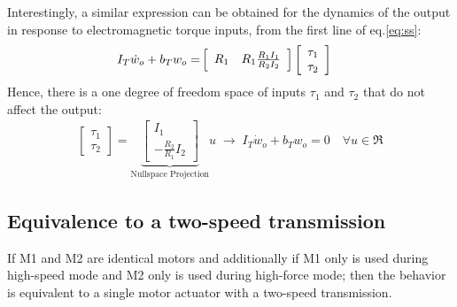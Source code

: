 Interestingly, a similar expression can be obtained for the dynamics of the output in response to electromagnetic torque inputs, from the first line of eq.\eqref{eq:ss}:
%
\begin{align}
I_T \dot{w}_o +
b_T  w_o
=&
\left[ \begin{array}{c c}
R_1 & R_1 \frac{R_1 I_1}{R_2 I_2}
\end{array} \right]
\left[ \begin{array}{c}
\tau_1 \\
\tau_2
\end{array} \right]
\label{eq:output}
\end{align}
% 
Hence, there is a one degree of freedom space of inputs $\tau_1$ and $\tau_2$ that do not affect the output:
\begin{align}
\left[ \begin{array}{c}
\tau_1 \\
\tau_2
\end{array} \right]
 = 
\underbrace{\left[ \begin{array}{c}
I_1 \\
-\frac{R_2 }{R_1 }  I_2
\end{array} \right]}_{\text{Nullspace Projection}} u
\; \rightarrow \;
I_T \dot{w}_o +
b_T  w_o = 0 \quad \forall u \in \Re
\label{eq:dyn_null_proj}
\end{align}


\subsection{Equivalence to a two-speed transmission}

If M1 and M2 are identical motors and additionally if M1 only is used during high-speed mode and M2 only is used during high-force mode; then the behavior is equivalent to a single motor actuator with a two-speed transmission. 

